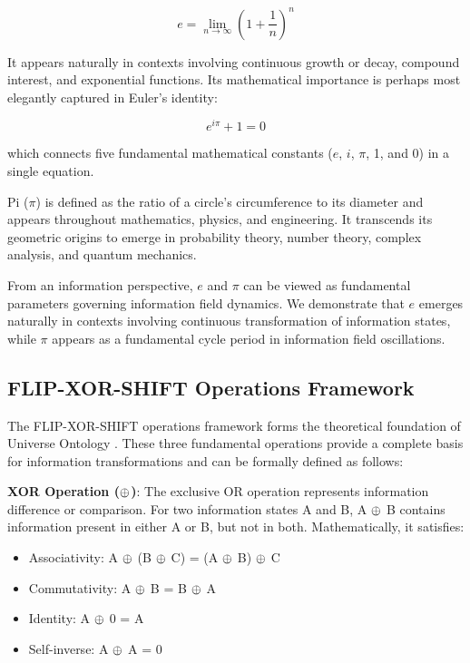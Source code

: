 \begin{equation}
e = \lim_{n \to \infty} \left(1 + \frac{1}{n}\right)^n
\end{equation}

It appears naturally in contexts involving continuous growth or decay, compound interest, and exponential functions. Its mathematical importance is perhaps most elegantly captured in Euler's identity:

\begin{equation}
e^{i\pi} + 1 = 0
\end{equation}

which connects five fundamental mathematical constants ($e$, $i$, $\pi$, 1, and 0) in a single equation.

Pi ($\pi$) is defined as the ratio of a circle's circumference to its diameter and appears throughout mathematics, physics, and engineering. It transcends its geometric origins to emerge in probability theory, number theory, complex analysis, and quantum mechanics.

From an information perspective, $e$ and $\pi$ can be viewed as fundamental parameters governing information field dynamics. We demonstrate that $e$ emerges naturally in contexts involving continuous transformation of information states, while $\pi$ appears as a fundamental cycle period in information field oscillations.

\subsection{FLIP-XOR-SHIFT Operations Framework}

The FLIP-XOR-SHIFT operations framework forms the theoretical foundation of Universe Ontology \cite{ma2025universe, niu2024xor}. These three fundamental operations provide a complete basis for information transformations and can be formally defined as follows:

\textbf{XOR Operation ($\oplus$)}: The exclusive OR operation represents information difference or comparison. For two information states A and B, A $\oplus$ B contains information present in either A or B, but not in both. Mathematically, it satisfies:
\begin{itemize}
    \item Associativity: A $\oplus$ (B $\oplus$ C) = (A $\oplus$ B) $\oplus$ C
    \item Commutativity: A $\oplus$ B = B $\oplus$ A
    \item Identity: A $\oplus$ 0 = A
    \item Self-inverse: A $\oplus$ A = 0
\end{itemize}

